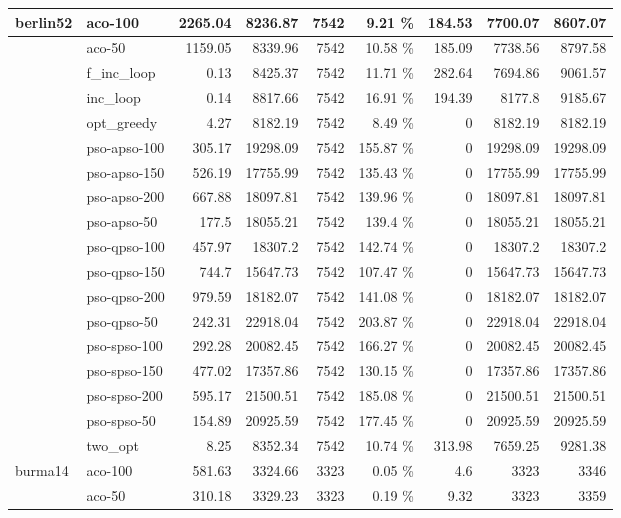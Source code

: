 \documentclass[conference]{IEEEtran}
\begin{document}
\begin{center}
\begin{longtable}[ht]{|l|l|r|r|r|r|r|r|r|}
                    \hline \hline
             \endlastfoot
berlin52 & aco-100 & 2265.04 & 8236.87 & 7542 & 9.21 \% & 184.53 & 7700.07 & 8607.07 \\ \hline
 & aco-50 & 1159.05 & 8339.96 & 7542 & 10.58 \% & 185.09 & 7738.56 & 8797.58 \\ \hline
 & f\_inc\_loop & 0.13 & 8425.37 & 7542 & 11.71 \% & 282.64 & 7694.86 & 9061.57 \\ \hline
 & inc\_loop & 0.14 & 8817.66 & 7542 & 16.91 \% & 194.39 & 8177.8 & 9185.67 \\ \hline
 & opt\_greedy & 4.27 & 8182.19 & 7542 & 8.49 \% & 0 & 8182.19 & 8182.19 \\ \hline
 & pso-apso-100 & 305.17 & 19298.09 & 7542 & 155.87 \% & 0 & 19298.09 & 19298.09 \\ \hline
 & pso-apso-150 & 526.19 & 17755.99 & 7542 & 135.43 \% & 0 & 17755.99 & 17755.99 \\ \hline
 & pso-apso-200 & 667.88 & 18097.81 & 7542 & 139.96 \% & 0 & 18097.81 & 18097.81 \\ \hline
 & pso-apso-50 & 177.5 & 18055.21 & 7542 & 139.4 \% & 0 & 18055.21 & 18055.21 \\ \hline
 & pso-qpso-100 & 457.97 & 18307.2 & 7542 & 142.74 \% & 0 & 18307.2 & 18307.2 \\ \hline
 & pso-qpso-150 & 744.7 & 15647.73 & 7542 & 107.47 \% & 0 & 15647.73 & 15647.73 \\ \hline
 & pso-qpso-200 & 979.59 & 18182.07 & 7542 & 141.08 \% & 0 & 18182.07 & 18182.07 \\ \hline
 & pso-qpso-50 & 242.31 & 22918.04 & 7542 & 203.87 \% & 0 & 22918.04 & 22918.04 \\ \hline
 & pso-spso-100 & 292.28 & 20082.45 & 7542 & 166.27 \% & 0 & 20082.45 & 20082.45 \\ \hline
 & pso-spso-150 & 477.02 & 17357.86 & 7542 & 130.15 \% & 0 & 17357.86 & 17357.86 \\ \hline
 & pso-spso-200 & 595.17 & 21500.51 & 7542 & 185.08 \% & 0 & 21500.51 & 21500.51 \\ \hline
 & pso-spso-50 & 154.89 & 20925.59 & 7542 & 177.45 \% & 0 & 20925.59 & 20925.59 \\ \hline
 & two\_opt & 8.25 & 8352.34 & 7542 & 10.74 \% & 313.98 & 7659.25 & 9281.38 \\ \hline
burma14 & aco-100 & 581.63 & 3324.66 & 3323 & 0.05 \% & 4.6 & 3323 & 3346 \\ \hline
 & aco-50 & 310.18 & 3329.23 & 3323 & 0.19 \% & 9.32 & 3323 & 3359 \\ \hline

\end{longtable}
\end{center}
\end{document}
